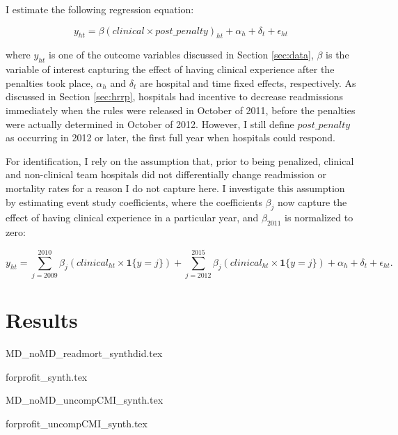 \documentclass[12pt]{article}
\begin{document}
    I estimate the following regression equation:

    \begin{equation}
    \label{eq:main}
    y_{ht} = \beta (clinical \times post\_penalty)_{ht} + \alpha_{h} + \delta_t + \epsilon_{ht}
    \end{equation}

    \noindent where $y_{ht}$ is one of the outcome variables discussed in Section \ref{sec:data}, $\beta$ is the variable of interest capturing the effect of having clinical experience after the penalties took place, $\alpha_h$ and $\delta_t$ are hospital and time fixed effects, respectively. As discussed in Section \ref{sec:hrrp}, hospitals had incentive to decrease readmissions immediately when the rules were released in October of 2011, before the penalties were actually determined in October of 2012. However, I still define $post\_penalty$ as occurring in 2012 or later, the first full year when hospitals could respond. 

    For identification, I rely on the assumption that, prior to being penalized, clinical and non-clinical team hospitals did not differentially change readmission or mortality rates for a reason I do not capture here. I investigate this assumption by estimating event study coefficients, where the coefficients $\beta_j$ now capture the effect of having clinical experience in a particular year, and $\beta_{2011}$ is normalized to zero:

    \begin{equation}
    \label{eq:es}
    y_{ht} = \sum_{j=2009}^{2010}\beta_j(clinical_{ht} \times \mathbf{1}\{y=j\}) + \sum_{j=2012}^{2015}\beta_j (clinical_{ht} \times \mathbf{1}\{y=j\}) + \alpha_{h} + \delta_t + \epsilon_{ht}.
    \end{equation}

    \section{Results}

    {MD_noMD_readmort_synthdid.tex}


    {forprofit_synth.tex}

    {MD_noMD_uncompCMI_synth.tex}

    {forprofit_uncompCMI_synth.tex}
\end{document}

